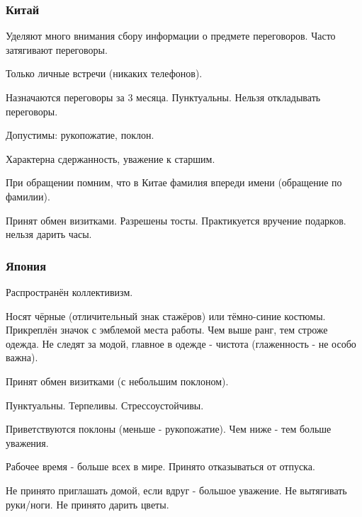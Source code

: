 \documentclass{article}
\begin{document}
\subsubsection{Китай}

Уделяют много внимания сбору информации о предмете переговоров. Часто затягивают переговоры.

Только личные встречи (никаких телефонов).

Назначаются переговоры за 3 месяца. Пунктуальны. Нельзя откладывать переговоры.

Допустимы: рукопожатие, поклон.

Характерна сдержанность, уважение к старшим.

При обращении помним, что в Китае фамилия впереди имени (обращение по фамилии).

Принят обмен визитками. Разрешены тосты. Практикуется вручение
подарков. нельзя дарить часы.

\subsubsection{Япония}

Распространён коллективизм.

Носят чёрные (отличительный знак стажёров) или тёмно-синие костюмы. Прикреплён значок с эмблемой места работы. Чем выше ранг, тем строже одежда. Не следят за модой, главное в одежде - чистота (глаженность - не особо важна).

Принят обмен визитками (с небольшим поклоном).

Пунктуальны. Терпеливы. Стрессоустойчивы.

Приветствуются поклоны (меньше - рукопожатие). Чем ниже - тем больше уважения.

Рабочее время - больше всех в мире. Принято отказываться от отпуска.

Не принято приглашать домой, если вдруг - большое уважение. Не вытягивать руки/ноги. Не принято дарить цветы.
\end{document}
